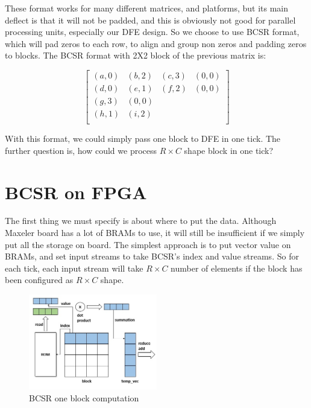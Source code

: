 \documentclass[a4paper, 10pt]{report}
\begin{document}
These format works for many different matrices, and platforms, but its main deflect is that it will not be padded, and this is obviously not good for parallel processing units, especially our DFE design. So we choose to use BCSR format, which will pad zeros to each row, to align and group non zeros and padding zeros to blocks. The BCSR format with 2X2 block of the previous matrix is:

$$
\begin{bmatrix}
	(a,0) & (b,2) & (c,3) & (0,0)\\
	(d,0) & (e,1) & (f,2) & (0,0)\\
	(g,3) & (0,0) \\
	(h,1) & (i,2) \\
\end{bmatrix}
$$

With this format, we could simply pass one block to DFE in one tick. The further question is, how could we process $R\times C$ shape block in one tick?

\section{BCSR on FPGA}

The first thing we must specify is about where to put the data. Although Maxeler board has a lot of BRAMs to use, it will still be insufficient if we simply put all the storage on board. The simplest approach is to put vector value on BRAMs, and set input streams to take BCSR's index and value streams. So for each tick, each input stream will take $R\times C$ number of elements if the block has been configured as $R\times C$ shape.

\begin{figure}[h!]
  \caption{BCSR one block computation}
  \centering
    \includegraphics[width=0.5\textwidth]{bcsr}
\end{figure}
\end{document}
